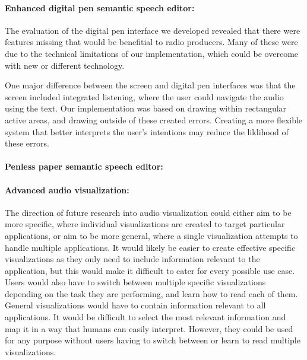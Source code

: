 \paragraph{Enhanced digital pen semantic speech editor:}
The evaluation of the digital pen interface we developed revealed that there were features missing that would be benefitial to radio producers. Many of these were due to the technical limitations of our implementation, which could be overcome with new or different technology.

One major difference between the screen and digital pen interfaces was that the screen included integrated listening, where the user could navigate the audio using the text. Our implementation was based on drawing within rectangular active areas, and drawing outside of these created errors. Creating a more flexible system that better interprets the user's intentions may reduce the liklihood of these errors. 

\paragraph{Penless paper semantic speech editor:}

\paragraph{Advanced audio visualization:}

The direction of future research into audio visualization could either aim to be more specific, where individual
visualizations are created to target particular applications, or aim to be more general, where a single visualization
attempts to handle multiple applications.
It would likely be easier to create effective specific visualizations as they
only need to include information relevant to the application, but this would make it difficult to cater for every
possible use case. Users would also have to switch between multiple specific visualizations depending on the task they
are performing, and learn how to read each of them. General visualizations would have to contain information relevant
to all applications. It would be difficult to select the most relevant information and map it in a way that humans can
easily interpret. However, they could be used for any purpose without users having to switch between or learn to read
multiple visualizations.

